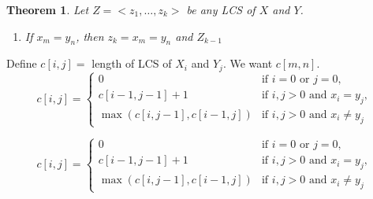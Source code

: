 \documentclass{article}
\newtheorem{theorem}{Theorem}
\begin{document}
\begin{theorem}
    Let \(Z = <z_1, \ldots, z_k>\) be any LCS of \(X\) and \(Y\).
    \begin{enumerate}
        \item If \(x_m = y_n\), then \(z_k = x_m = y_n\) and \(Z_{k-1}\)
    \end{enumerate}
\end{theorem}

Define \(c[i, j] = \) length of LCS of \(X_i\) and \(Y_j\). We want \(c[m, n]\).
\begin{equation*}
    c[i, j] = \begin{cases}
        0                          & \text{if } i = 0 \text{ or } j = 0,           \\
        c[i-1, j-1] + 1            & \text{if } i, j > 0 \text{ and } x_i = y_j,   \\
        \max(c[i, j-1], c[i-1, j]) & \text{if } i, j > 0 \text{ and } x_i \neq y_j
    \end{cases}
\end{equation*}

\begin{equation*}
    c[i, j] = \begin{cases}
        0                          & \text{if } i = 0 \text{ or } j = 0,           \\
        c[i-1, j-1] + 1            & \text{if } i, j > 0 \text{ and } x_i = y_j,   \\
        \max(c[i, j-1], c[i-1, j]) & \text{if } i, j > 0 \text{ and } x_i \neq y_j
    \end{cases}
\end{equation*}

\end{document}
